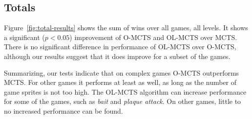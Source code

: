 \subsection{Totals}
\label{subsec:totals}
Figure~\ref{fig:total-results} shows the sum of wins over all games, all levels.
It shows a significant ($p < 0.05$) improvement of O-MCTS and OL-MCTS over
MCTS\@.  There is no significant difference in performance of OL-MCTS over
O-MCTS, although our results suggest that it does improve for a subset of the
games. 

Summarizing, our tests indicate that on complex games O-MCTS outperforms MCTS\@.
For other games it performs at least as well, as long as the number of game
sprites is not too high.  The OL-MCTS algorithm can increase performance for
some of the games, such as \textit{bait} and \textit{plaque attack}. On other
games, little to no increased performance can be found.

